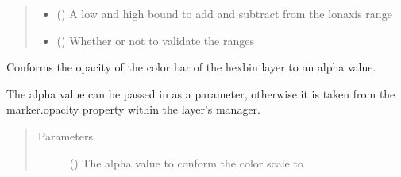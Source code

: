 \documentclass[letterpaper,10pt,english]{sphinxmanual}
\begin{document}
\begin{fulllineitems}
\begin{fulllineitems}
\begin{quote}
\begin{description}
\begin{itemize}
\item {} 
\sphinxAtStartPar
{} (\sphinxstyleliteralemphasis{\sphinxupquote{{[}}}\sphinxstyleliteralemphasis{\sphinxupquote{, }}\sphinxstyleliteralemphasis{\sphinxupquote{{]}}}) \textendash{} A low and high bound to add and subtract from the lonaxis range

\item {} 
\sphinxAtStartPar
{} () \textendash{} Whether or not to validate the ranges

\end{itemize}

\end{description}\end{quote}

\end{fulllineitems}


\begin{fulllineitems}
\label{\detokenize{builder:geohexviz.builder.PlotBuilder.adjust_opacity}}
\sphinxAtStartPar
Conforms the opacity of the color bar of the hexbin layer to an alpha value.

\sphinxAtStartPar
The alpha value can be passed in as a parameter, otherwise it is taken
from the marker.opacity property within the layer’s manager.
\begin{quote}\begin{description}
\item[{Parameters}] \leavevmode
\sphinxAtStartPar
{} () \textendash{} The alpha value to conform the color scale to

\end{description}\end{quote}

\end{fulllineitems}


\end{fulllineitems}
\end{document}
